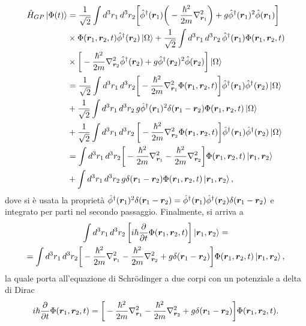 \begin{equation}
    \begin{split}
        \hat{H}_{GP}\ket{\Phi(t)} &= \frac{1}{\sqrt{2}}\int d^3r_1\,d^3r_2\bigg[\hat{\phi}^\dagger(\bm{r}_1)\bigg(-\frac{\hbar^2}{2m}\nabla^2_{\bm{r}_1}\bigg) + g\hat{\phi}^\dagger(\bm{r}_1)^2\hat{\phi}(\bm{r}_1)\bigg] \\
        &\times\Phi(\bm{r}_1,\bm{r}_2,t)\hat{\phi}^\dagger(\bm{r}_2)\ket{\Omega} + \frac{1}{\sqrt{2}}\int d^3r_1\,d^3r_2\,\hat{\phi}^\dagger(\bm{r}_1)\Phi(\bm{r}_1,\bm{r}_2,t) \\
        &\times\bigg[-\frac{\hbar^2}{2m}\nabla^2_{\bm{r}_2}\hat{\phi}^\dagger(\bm{r}_2) + g\hat{\phi}^\dagger(\bm{r}_2)^2\hat{\phi}(\bm{r}_2)\bigg]\ket{\Omega} \\
        &= \frac{1}{\sqrt{2}}\int d^3r_1\,d^3r_2\bigg[-\frac{\hbar^2}{2m}\nabla^2_{\bm{r}_1}\Phi(\bm{r}_1,\bm{r}_2,t)\bigg]\hat{\phi}^\dagger(\bm{r}_1)\hat{\phi}^\dagger(\bm{r}_2)\ket{\Omega} \\
        &+ \frac{1}{\sqrt{2}}\int d^3r_1\,d^3r_2\, g\hat{\phi}^\dagger(\bm{r}_1)^2\delta(\bm{r}_1 - \bm{r}_2)\Phi(\bm{r}_1,\bm{r}_2,t)\ket{\Omega} \\
        &+ \frac{1}{\sqrt{2}}\int d^3r_1\,d^3r_2\,\bigg[-\frac{\hbar^2}{2m}\nabla^2_{\bm{r}_2}\Phi(\bm{r}_1,\bm{r}_2,t)\bigg]\hat{\phi}^\dagger(\bm{r}_1)\hat{\phi}^\dagger(\bm{r}_2)\ket{\Omega} \\
        &= \int d^3r_1\,d^3r_2\bigg[-\frac{\hbar^2}{2m}\nabla^2_{\bm{r}_1} -\frac{\hbar^2}{2m}\nabla^2_{\bm{r}_2}\bigg]\Phi(\bm{r}_1,\bm{r}_2,t)\ket{\bm{r}_1,\bm{r}_2} \\
        &+ \int d^3r_1\,d^3r_2\,g\delta(\bm{r}_1 - \bm{r}_2)\Phi(\bm{r}_1,\bm{r}_2,t)\ket{\bm{r}_1,\bm{r}_2},
    \end{split}
\end{equation}
dove si è usata la proprietà $\hat{\phi}^\dagger(\bm{r}_1)^2\delta(\bm{r}_1 - \bm{r}_2) = \hat{\phi}^\dagger(\bm{r}_1)\hat{\phi}^\dagger(\bm{r}_2)\delta(\bm{r}_1 - \bm{r}_2)$ e integrato per parti nel secondo passaggio. Finalmente, si arriva a 
\begin{multline}
    \int d^3r_1\,d^3r_2\,\bigg[i\hbar\frac{\partial}{\partial t}\Phi(\bm{r}_1,\bm{r}_2,t)\bigg]\ket{\bm{r}_1,\bm{r}_2} = \\ = \int d^3r_1\,d^3r_2\bigg[-\frac{\hbar^2}{2m}\nabla^2_{\bm{r}_1} -\frac{\hbar^2}{2m}\nabla^2_{\bm{r}_2} + g\delta(\bm{r}_1 - \bm{r}_2)\bigg]\Phi(\bm{r}_1,\bm{r}_2,t)\ket{\bm{r}_1,\bm{r}_2},
\end{multline}
la quale porta all'equazione di Schr\"odinger a due corpi con un potenziale a delta di Dirac
\begin{equation}
    i\hbar\frac{\partial}{\partial t}\Phi(\bm{r}_1,\bm{r}_2,t) = \bigg[-\frac{\hbar^2}{2m}\nabla^2_{\bm{r}_1} -\frac{\hbar^2}{2m}\nabla^2_{\bm{r}_2} + g\delta(\bm{r}_1 - \bm{r}_2)\bigg]\Phi(\bm{r}_1,\bm{r}_2,t).
\end{equation}
